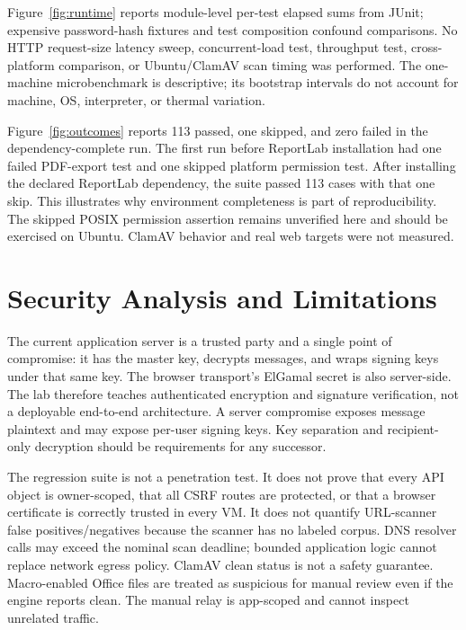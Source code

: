\documentclass[conference]{IEEEtran}
\begin{document}
Figure~\ref{fig:runtime} reports module-level per-test elapsed sums from JUnit; expensive password-hash fixtures and test composition confound comparisons. No HTTP request-size latency sweep, concurrent-load test, throughput test, cross-platform comparison, or Ubuntu/ClamAV scan timing was performed. The one-machine microbenchmark is descriptive; its bootstrap intervals do not account for machine, OS, interpreter, or thermal variation.

Figure~\ref{fig:outcomes} reports 113 passed, one skipped, and zero failed in the dependency-complete run. The first run before ReportLab installation had one failed PDF-export test and one skipped platform permission test. After installing the declared ReportLab dependency, the suite passed 113 cases with that one skip. This illustrates why environment completeness is part of reproducibility. The skipped POSIX permission assertion remains unverified here and should be exercised on Ubuntu. ClamAV behavior and real web targets were not measured.

\section{Security Analysis and Limitations}
The current application server is a trusted party and a single point of compromise: it has the master key, decrypts messages, and wraps signing keys under that same key. The browser transport's ElGamal secret is also server-side. The lab therefore teaches authenticated encryption and signature verification, not a deployable end-to-end architecture. A server compromise exposes message plaintext and may expose per-user signing keys. Key separation and recipient-only decryption should be requirements for any successor.

The regression suite is not a penetration test. It does not prove that every API object is owner-scoped, that all CSRF routes are protected, or that a browser certificate is correctly trusted in every VM. It does not quantify URL-scanner false positives/negatives because the scanner has no labeled corpus. DNS resolver calls may exceed the nominal scan deadline; bounded application logic cannot replace network egress policy. ClamAV clean status is not a safety guarantee. Macro-enabled Office files are treated as suspicious for manual review even if the engine reports clean. The manual relay is app-scoped and cannot inspect unrelated traffic.
\end{document}

